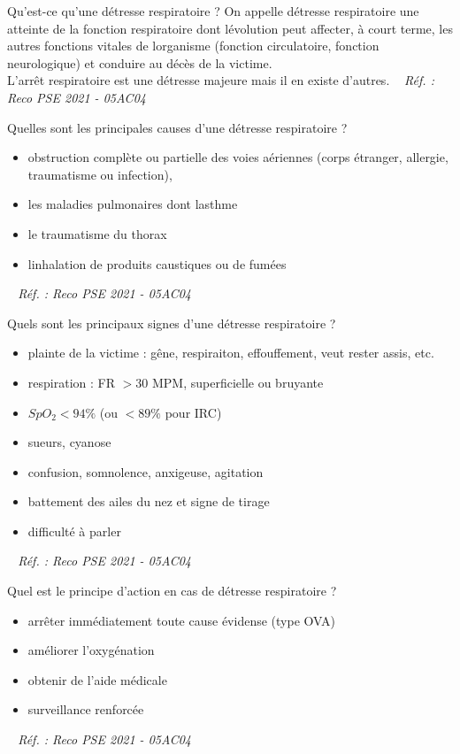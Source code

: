\documentclass[grid,avery5371,landscape]{flashcards}
\makeatletter
\newcounter{nocarte}
\newcommand{\categ}[1]{%
  \def\@categ{#1}%
  \setcounter{nocarte}{0}%
}
\newcommand{\source}[1]{%
  \medskip
  \itshape%
   ~ \hfill Réf. : #1}
\makeatother
\begin{document}
\color[HTML]{003273}
\categ{PSE}
\begin{flashcard}[bilan]{
 Qu'est-ce qu'une détresse respiratoire ?   }
  On appelle détresse respiratoire une atteinte de la fonction respiratoire dont lévolution peut affecter, à court terme, les autres fonctions vitales de lorganisme (fonction circulatoire, fonction neurologique) et conduire au décès de la victime. \\ L'arrêt respiratoire est une détresse majeure mais il en existe d'autres.
  \source{Reco PSE 2021 - 05AC04}
\end{flashcard}


\color[HTML]{003273}
\categ{PSE}
\begin{flashcard}[bilan]{
 Quelles sont les principales causes d'une détresse respiratoire ?   }
  \begin{itemize} \item obstruction complète ou partielle des voies aériennes (corps étranger, allergie, traumatisme ou infection),
\item les maladies pulmonaires dont lasthme
\item le traumatisme du thorax 
\item linhalation de produits caustiques ou de fumées \end{itemize}
  \source{Reco PSE 2021 - 05AC04}
\end{flashcard}


\color[HTML]{003273}
\categ{PSE}
\begin{flashcard}[bilan]{
 Quels sont les principaux signes d'une détresse respiratoire ?   }
  \begin{itemize}
 \item plainte de la victime : gêne, respiraiton, effouffement, veut rester assis, etc.
\item respiration : FR $>30$ MPM, superficielle ou bruyante 
\item $SpO_2<94\%$ (ou $<89\%$ pour IRC) 
\item sueurs, cyanose 
\item confusion, somnolence, anxigeuse, agitation 
\item battement des ailes du nez et signe de tirage
 \item difficulté à parler
\end{itemize}
  \source{Reco PSE 2021 - 05AC04}
\end{flashcard}


\color[HTML]{003273}
\categ{PSE}
\begin{flashcard}[bilan]{
 Quel est le principe d'action en cas de détresse respiratoire ?   }
  \begin{itemize} \item arrêter immédiatement toute cause évidense (type OVA) \item améliorer l'oxygénation \item obtenir de l'aide médicale \item surveillance renforcée \end{itemize}
  \source{Reco PSE 2021 - 05AC04}
\end{flashcard}
\end{document}
